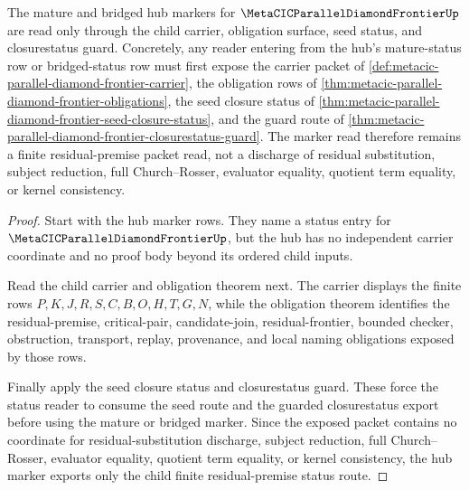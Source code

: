 \begin{theorem}
\label{thm:metacic-parallel-diamond-frontier-seed-marker-route}
The mature and bridged hub markers for $\MetaCICParallelDiamondFrontierUp$ are read only through the child carrier, obligation surface, seed status, and closurestatus guard. Concretely, any reader entering from the hub's mature-status row or bridged-status row must first expose the carrier packet of \autoref{def:metacic-parallel-diamond-frontier-carrier}, the obligation rows of \autoref{thm:metacic-parallel-diamond-frontier-obligations}, the seed closure status of \autoref{thm:metacic-parallel-diamond-frontier-seed-closure-status}, and the guard route of \autoref{thm:metacic-parallel-diamond-frontier-closurestatus-guard}. The marker read therefore remains a finite residual-premise packet read, not a discharge of residual substitution, subject reduction, full Church--Rosser, evaluator equality, quotient term equality, or kernel consistency.
\end{theorem}
\begin{proof}
Start with the hub marker rows. They name a status entry for $\MetaCICParallelDiamondFrontierUp$, but the hub has no independent carrier coordinate and no proof body beyond its ordered child inputs.

Read the child carrier and obligation theorem next. The carrier displays the finite rows $P,K,J,R,S,C,B,O,H,T,G,N$, while the obligation theorem identifies the residual-premise, critical-pair, candidate-join, residual-frontier, bounded checker, obstruction, transport, replay, provenance, and local naming obligations exposed by those rows.

Finally apply the seed closure status and closurestatus guard. These force the status reader to consume the seed route and the guarded closurestatus export before using the mature or bridged marker. Since the exposed packet contains no coordinate for residual-substitution discharge, subject reduction, full Church--Rosser, evaluator equality, quotient term equality, or kernel consistency, the hub marker exports only the child finite residual-premise status route.
\end{proof}
